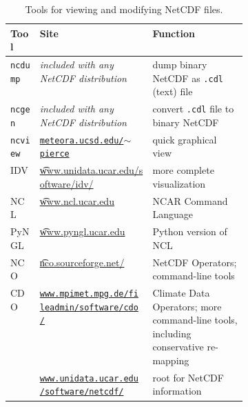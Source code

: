 \newcommand{\netcdftool}[1]{#1\index{NetCDF!tools!#1}}
\begin{table}[ht]
\centering
\caption{Tools for viewing and modifying NetCDF files.}\label{tab:NetCDFview} 
\small
\begin{tabular}{llp{0.4\linewidth}}
  \\\toprule
  \textbf{Tool} & \textbf{Site} & \textbf{Function}\\ \midrule
\netcdftool{\texttt{ncdump}} & \emph{included with any NetCDF distribution} & dump binary NetCDF as \texttt{.cdl} (text) file \\
\netcdftool{\texttt{ncgen}} & \emph{included with any NetCDF distribution} & convert \texttt{.cdl} file to binary NetCDF \\
\netcdftool{\texttt{ncview}} & \href{http://meteora.ucsd.edu/~pierce/ncview_home_page.html}{\texttt{meteora.ucsd.edu/$\sim$pierce}} & quick graphical view \\
\netcdftool{IDV} & \href{http://www.unidata.ucar.edu/software/idv/}{\t{www.unidata.ucar.edu/software/idv/}} & more complete visualization \\
\netcdftool{NCL} &  \href{http://www.ncl.ucar.edu}{\t{www.ncl.ucar.edu}} & NCAR Command Language\\
\netcdftool{PyNGL} &  \href{http://www.pyngl.ucar.edu}{\t{www.pyngl.ucar.edu}} & Python version of NCL\\
\netcdftool{NCO}\index{NCO (NetCDF Operators)} & \href{http://nco.sourceforge.net/}{\t{nco.sourceforge.net/}} & NetCDF Operators; command-line tools\\
\netcdftool{CDO} & \href{http://code.zmaw.de/projects/cdo}{\texttt{www.mpimet.mpg.de/fileadmin/software/cdo/}} & Climate Data Operators; more command-line tools, including conservative re-mapping \\
 & \href{http://www.unidata.ucar.edu/software/netcdf/}{\texttt{www.unidata.ucar.edu/software/netcdf/}} & root for NetCDF information
\\\bottomrule
\end{tabular}
\normalsize
\end{table}




